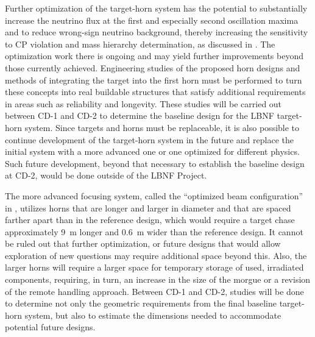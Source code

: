  
Further optimization of the target-horn system has the potential to substantially increase the neutrino flux at the first and especially second oscillation maxima and to reduce wrong-sign neutrino background, thereby increasing the sensitivity to CP 
violation and mass hierarchy determination, as discussed in \volphys.  The optimization work there is ongoing and may yield further improvements beyond those currently achieved. Engineering studies of the proposed horn designs and methods 
of integrating the target into the first horn must be performed to turn these concepts into real buildable structures that satisfy additional requirements in areas such as reliability and longevity.  These studies will be carried out between CD-1 and CD-2 to 
determine the baseline design for the LBNF target-horn system.  Since targets and horns must be replaceable, it is also possible to continue development of the target-horn system in the future and replace the initial system with a more advanced 
one or one optimized for different physics.  Such future development, beyond that necessary to establish the baseline design at CD-2, would be done outside of the LBNF Project.
 
The more advanced focusing system, called the ``optimized beam configuration'' in \volphys, utilizes horns that are longer and larger in diameter and that are spaced farther apart than in the reference design, which would require a target chase approximately 9~m longer and 0.6~m wider 
than the reference design.  It cannot be ruled out that further optimization, or future designs that would
allow exploration of new questions may require additional space beyond this.  Also, the larger horns will require a larger 
space for temporary storage of used, irradiated components, requiring, in turn, an increase in the size of the morgue or a revision of the remote handling approach.  Between CD-1 and CD-2, studies will be done to determine not only the geometric 
requirements from the final baseline target-horn system, but also to estimate the dimensions needed to accommodate potential future designs.
 

